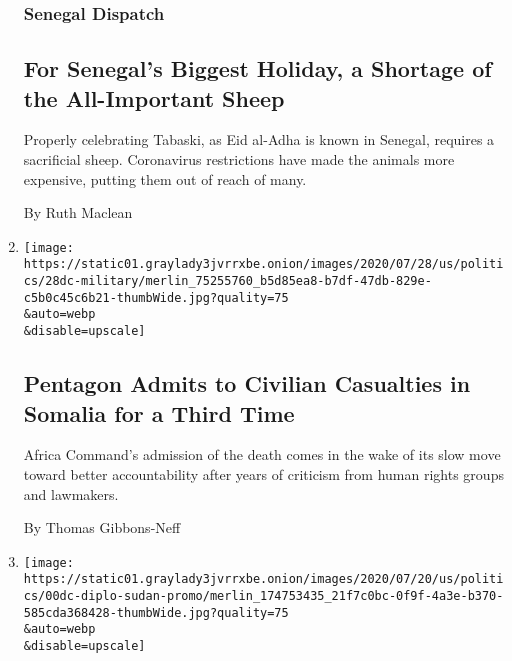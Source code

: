 \begin{enumerate}
  \hypertarget{senegal-dispatch}{%
  \subsubsection{Senegal Dispatch}\label{senegal-dispatch}}

  \hypertarget{for-senegals-biggest-holiday-a-shortage-of-the-all-important-sheep}{%
  \subsection{For Senegal's Biggest Holiday, a Shortage of the
  All-Important
  Sheep}\label{for-senegals-biggest-holiday-a-shortage-of-the-all-important-sheep}}

  Properly celebrating Tabaski, as Eid al-Adha is known in Senegal,
  requires a sacrificial sheep. Coronavirus restrictions have made the
  animals more expensive, putting them out of reach of many.

  By Ruth Maclean
\item
  \href{/2020/07/28/world/africa/pentagon-somalia-civilian-casualties.html}{}

  \texttt{[image: https://static01.graylady3jvrrxbe.onion/images/2020/07/28/us/politics/28dc-military/merlin\_75255760\_b5d85ea8-b7df-47db-829e-c5b0c45c6b21-thumbWide.jpg?quality=75\\\&auto=webp\\\&disable=upscale]}

  \hypertarget{pentagon-admits-to-civilian-casualties-in-somalia-for-a-third-time}{%
  \subsection{Pentagon Admits to Civilian Casualties in Somalia for a
  Third
  Time}\label{pentagon-admits-to-civilian-casualties-in-somalia-for-a-third-time}}

  Africa Command's admission of the death comes in the wake of its slow
  move toward better accountability after years of criticism from human
  rights groups and lawmakers.

  By Thomas Gibbons-Neff
\item
  \href{/2020/07/25/us/politics/sudan-compensation-embassy-bombings.html}{}

  \texttt{[image: https://static01.graylady3jvrrxbe.onion/images/2020/07/20/us/politics/00dc-diplo-sudan-promo/merlin\_174753435\_21f7c0bc-0f9f-4a3e-b370-585cda368428-thumbWide.jpg?quality=75\\\&auto=webp\\\&disable=upscale]}

  \hypertarget{compensation-for-embassy-bombing-victims-could-imperil-thaw-with-sudan}{%
}
\end{enumerate}
